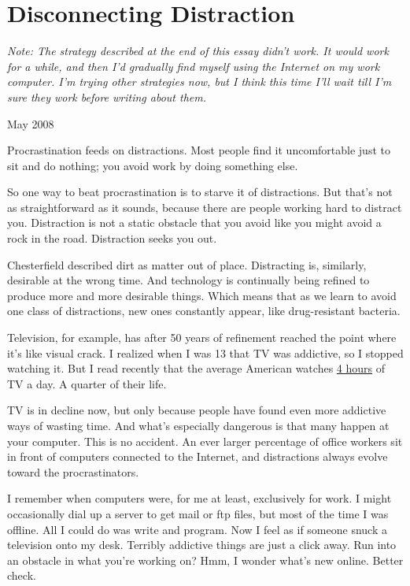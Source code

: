 \chapter{Disconnecting Distraction}

\emph{Note: The strategy described at the end of this essay didn't work.
It would work for a while, and then I'd gradually find myself using the
Internet on my work computer. I'm trying other strategies now, but I
think this time I'll wait till I'm sure they work before writing about
them.}

May 2008

Procrastination feeds on distractions. Most people find it uncomfortable
just to sit and do nothing; you avoid work by doing something else.

So one way to beat procrastination is to starve it of distractions. But
that's not as straightforward as it sounds, because there are people
working hard to distract you. Distraction is not a static obstacle that
you avoid like you might avoid a rock in the road. Distraction seeks you
out.

Chesterfield described dirt as matter out of place. Distracting is,
similarly, desirable at the wrong time. And technology is continually
being refined to produce more and more desirable things. Which means
that as we learn to avoid one class of distractions, new ones constantly
appear, like drug-resistant bacteria.

Television, for example, has after 50 years of refinement reached the
point where it's like visual crack. I realized when I was 13 that TV was
addictive, so I stopped watching it. But I read recently that the
average American watches
\href{http://www.forbes.com/forbes/2003/0929/076.html}{4 hours} of TV a
day. A quarter of their life.

TV is in decline now, but only because people have found even more
addictive ways of wasting time. And what's especially dangerous is that
many happen at your computer. This is no accident. An ever larger
percentage of office workers sit in front of computers connected to the
Internet, and distractions always evolve toward the procrastinators.

I remember when computers were, for me at least, exclusively for work. I
might occasionally dial up a server to get mail or ftp files, but most
of the time I was offline. All I could do was write and program. Now I
feel as if someone snuck a television onto my desk. Terribly addictive
things are just a click away. Run into an obstacle in what you're
working on? Hmm, I wonder what's new online. Better check.


